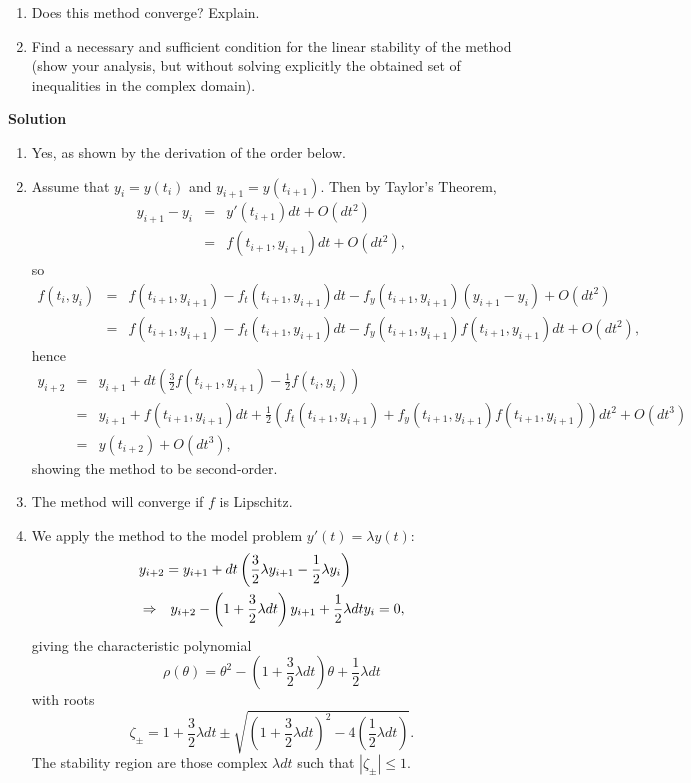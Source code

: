 \documentclass{article}
\begin{document}
\begin{enumerate}
\begin{enumerate}
\item Does this method converge?  Explain.

\item Find a necessary and sufficient condition for the linear stability of the method (show your analysis, but without solving explicitly the obtained set of inequalities in the complex domain).

\end{enumerate}

{\bf Solution}

\begin{enumerate}
\item Yes, as shown by the derivation of the order below.

\item Assume that \(y_i = y(t_i)\) and \(y_{i + 1} = y(t_{i + 1})\).  Then by Taylor's Theorem,
\begin{eqnarray*}
y_{i + 1} - y_i & = & y'(t_{i + 1}) dt + O(dt^2) \\
                & = & f(t_{i+1},y_{i+1}) dt + O(dt^2),
\end{eqnarray*}
so
\begin{eqnarray*}
f(t_i,y_i) & = & f(t_{i+1},y_{i+1}) - f_t(t_{i+1},y_{i+1}) dt - f_y(t_{i+1},y_{i+1}) (y_{i + 1} - y_i) + O(dt^2) \\
           & = & f(t_{i+1},y_{i+1}) - f_t(t_{i+1},y_{i+1}) dt - f_y(t_{i+1},y_{i+1}) f(t_{i+1},y_{i+1}) dt + O(dt^2),
\end{eqnarray*}
hence
\begin{eqnarray*}
y_{i + 2} & = & y_{i + 1} + dt \left( \frac{3}{2} f(t_{i + 1}, y_{i + 1}) - \frac{1}{2} f(t_i, y_i) \right) \\
          & = & y_{i + 1} + f(t_{i+1},y_{i+1}) dt + \frac{1}{2} \left( f_t(t_{i+1},y_{i+1}) + f_y(t_{i+1},y_{i+1}) f(t_{i+1},y_{i+1}) \right) dt^2 + O(dt^3) \\
          & = & y(t_{i+2}) + O(dt^3),
\end{eqnarray*}
showing the method to be second-order.

\item The method will converge if \(f\) is Lipschitz.

\item We apply the method to the model problem \(y'(t) = \lambda y(t)\):
\begin{eqnarray*}
\lefteqn{y_{i + 2} = y_{i + 1} + dt \left( \frac{3}{2} \lambda y_{i + 1} - \frac{1}{2} \lambda y_i \right)} \\
& \Rightarrow & y_{i + 2} - \left( 1 + \frac{3}{2} \lambda dt \right) y_{i + 1} + \frac{1}{2} \lambda dt y_i = 0,
\end{eqnarray*}
giving the characteristic polynomial
\[\rho(\theta) = \theta^2 - \left( 1 + \frac{3}{2} \lambda dt \right) \theta + \frac{1}{2} \lambda dt\]
with roots
\[\zeta_{\pm} = 1 + \frac{3}{2} \lambda dt \pm \sqrt{ \left( 1 + \frac{3}{2} \lambda dt \right)^2 - 4 \left( \frac{1}{2} \lambda dt \right)}.\]
The stability region are those complex \(\lambda dt\) such that \(|\zeta_{\pm}| \leq 1\).


\end{enumerate}
\end{enumerate}
\end{document}
